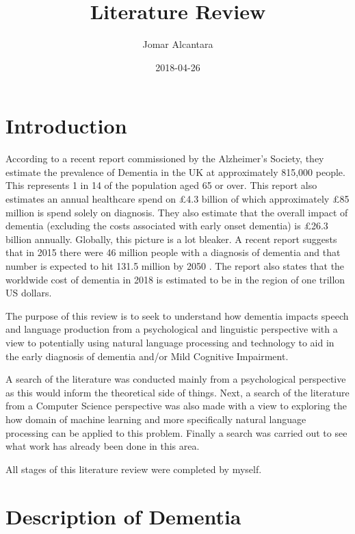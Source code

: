 \documentclass[a4paper]{article}
\title{Literature Review}
\date{2018-04-26}
\author{Jomar Alcantara}
\begin{document}
\maketitle
\newpage
\tableofcontents
\newpage

\section{Introduction}

\par
According to a recent report commissioned by the Alzheimer's Society, they estimate the prevalence of Dementia in the UK at approximately 815,000 people. This represents 1 in 14 of the population aged 65 or over. This report also estimates an annual healthcare spend on £4.3 billion of which approximately £85 million is spend solely on diagnosis. They also estimate that the overall impact of dementia (excluding the costs associated with early onset dementia) is £26.3 billion annually. Globally, this picture is a lot bleaker. A recent report suggests that in 2015 there were 46 million people with a diagnosis of dementia and that number is expected to hit 131.5 million by 2050 \cite{Prince2015}. The report also states that the worldwide cost of dementia in 2018 is estimated to be in the region of one trillon US dollars.
\newline
\par
The purpose of this review is to seek to understand how dementia impacts speech and language production from a psychological and linguistic perspective with a view to potentially using natural language processing and technology to aid in the early diagnosis of dementia and/or Mild Cognitive Impairment.
\newline
\par
A search of the literature was conducted mainly from a psychological perspective as this would inform the theoretical side of things. Next, a search of the literature from a Computer Science perspective was also made with a view to exploring the how domain of machine learning and more specifically natural language processing can be applied to this problem. Finally a search was carried out to see what work has already been done in this area.

All stages of this literature review were completed by myself. 

\section{Description of Dementia}
\end{document}
